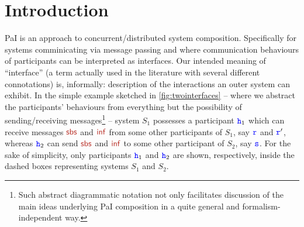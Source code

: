 
\section{Introduction}
\label{sec:Intro}

PaI is an approach to concurrent/distributed system composition. 
Specifically for systems comminicating via message passing and where
communication behaviours of participants can be interpreted as interfaces.  
Our intended meaning of ``interface'' (a term actually used in the literature with  several different connotations) is, informally: description of the interactions an outer system can
exhibit. 
In the simple example sketched in \cref{fig:twointerfaces}
--  where we abstract the participants' behaviours from everything but the possibility of 
 sending/receiving messages\footnote{Such abstract diagrammatic notation not only facilitates  
 discussion of the main ideas underlying PaI composition in a quite general  and formalism-independent way.}
   -- system $S_1$ possesses a participant 
 ${\mathtt{\color{blue}{ {h}}}}_1$ which can receive messages $\msg[sbs]$ and $\msg[inf]$ from some other participants of $S_1$, say ${\mathtt{\color{blue}{ {r}}}}$ and ${\mathtt{\color{blue}{ {r}}}}'$, whereas ${\mathtt{\color{blue}{ {h}}}}_2$ can send $\msg[sbs]$ and $\msg[inf]$ to some other participant of $S_2$, say ${\mathtt{\color{blue}{ {s}}}}$. 
For the sake of simplicity, only participants ${\mathtt{\color{blue}{ {h}}}}_1$ and ${\mathtt{\color{blue}{ {h}}}}_2$ are shown, respectively, inside the dashed boxes representing systems  $S_1$ and $S_2$.
 \begin{figure}[h]
\end{figure}

